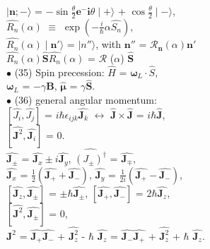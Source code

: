 \documentclass[a4paper, 10pt, onepage]{elegantbook}
\begin{document}
{$\mid \mathbf n; - \rangle$ = $- \sin \frac{\theta}{2} \mathbf{e}^- {\mathbf{i} \theta} \mid + \rangle$ + $\cos \frac{\theta}{2} \mid - \rangle$, \\

$\hat{R_n} (\alpha)$ $\equiv$ $\exp(- \frac{i}{\hbar} \alpha \hat{S_n})$, \\ 

$\hat{R_n} (\alpha) \mid \mathbf n' \rangle$ = $\mid n'' \rangle$, with $ \mathbf n''$ = $\mathcal{R_\mathbf n} (\alpha) \mathbf n'$ \\

$\hat{R_n}(\alpha) \hat{\mathbf S} \hat{R_n}(\alpha)$ = ${\mathcal{R}}$ ($\alpha$) $\hat{\mathbf{S}}$ \\

$\bullet$ (35) Spin precession: $ \hat{H}$ = $ {\mathbf \omega_L} \cdot \hat{S}$,  \\

$ {\mathbf \omega_L}$ = $ - \gamma{\mathbf B}$, $ \hat{\mathbf \mu}$ = $ \gamma \hat{\mathbf S}$.  \\

$\bullet$ (36) general angular momentum: \\

$ [\hat{J_i}, \hat{J_j}]$ = $i \hbar \epsilon_{ijk} \hat{\mathbf J_k}$ $\longleftrightarrow$ $\hat{\mathbf J} \times \hat{\mathbf J}$ = $ i \hbar \hat{\mathbf J}$,  \\

$[\hat{\mathbf J^2},\hat{\mathbf J_i}] $ = 0.  \\  

$ \hat{\mathbf J_ \pm}$ = $\hat{\mathbf J_x} \pm i \hat{\mathbf J_y}$, $ \hat{(J_ \pm)^\dagger}$ = $\hat{\mathbf J_\mp}$, \\

$\hat{\mathbf J_x}$ = $\frac{1}{2} (\hat{\mathbf J_+} + \hat{\mathbf J_-})$, $\hat{\mathbf J_y}$ = $\frac{1}{2i}(\hat{\mathbf J_+} - \hat{\mathbf J_-})$,  \\  

$[\hat{\mathbf J_z}, \hat{\mathbf J_ \pm}]$ = $ \pm \hbar \hat{\mathbf J_ \pm}$, $[\hat{\mathbf J_+}, \hat{\mathbf J_-}]$ = $2 \hbar \hat{\mathbf J_z}$,  \\

$[\hat{\mathbf J^2}, \hat{\mathbf J_\pm}]$ = 0,  \\  

$\hat{\mathbf J^2}$ = $\hat{\mathbf J_+} \hat{\mathbf J_-}$ + $\hat{\mathbf J^2_z}$ - $\hbar$ $\hat{\mathbf J_z}$ = $\hat{\mathbf J_-} \hat{\mathbf J_+}$ + $\hat{\mathbf J^2_z}$ + $\hbar$ $\hat{\mathbf J_z}$.  \\

}
\end{document}
